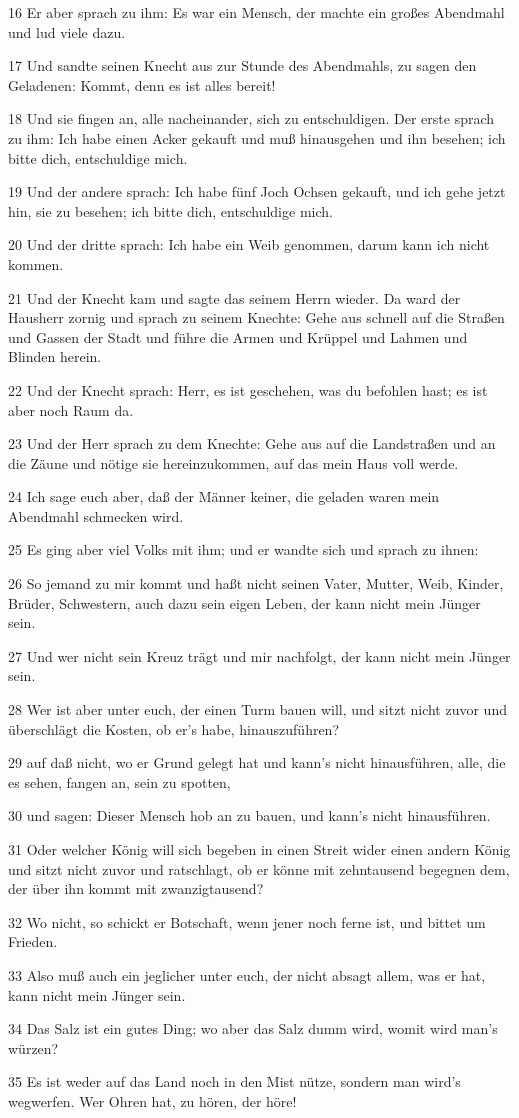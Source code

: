 \par 16 Er aber sprach zu ihm: Es war ein Mensch, der machte ein großes Abendmahl und lud viele dazu.
\par 17 Und sandte seinen Knecht aus zur Stunde des Abendmahls, zu sagen den Geladenen: Kommt, denn es ist alles bereit!
\par 18 Und sie fingen an, alle nacheinander, sich zu entschuldigen. Der erste sprach zu ihm: Ich habe einen Acker gekauft und muß hinausgehen und ihn besehen; ich bitte dich, entschuldige mich.
\par 19 Und der andere sprach: Ich habe fünf Joch Ochsen gekauft, und ich gehe jetzt hin, sie zu besehen; ich bitte dich, entschuldige mich.
\par 20 Und der dritte sprach: Ich habe ein Weib genommen, darum kann ich nicht kommen.
\par 21 Und der Knecht kam und sagte das seinem Herrn wieder. Da ward der Hausherr zornig und sprach zu seinem Knechte: Gehe aus schnell auf die Straßen und Gassen der Stadt und führe die Armen und Krüppel und Lahmen und Blinden herein.
\par 22 Und der Knecht sprach: Herr, es ist geschehen, was du befohlen hast; es ist aber noch Raum da.
\par 23 Und der Herr sprach zu dem Knechte: Gehe aus auf die Landstraßen und an die Zäune und nötige sie hereinzukommen, auf das mein Haus voll werde.
\par 24 Ich sage euch aber, daß der Männer keiner, die geladen waren mein Abendmahl schmecken wird.
\par 25 Es ging aber viel Volks mit ihm; und er wandte sich und sprach zu ihnen:
\par 26 So jemand zu mir kommt und haßt nicht seinen Vater, Mutter, Weib, Kinder, Brüder, Schwestern, auch dazu sein eigen Leben, der kann nicht mein Jünger sein.
\par 27 Und wer nicht sein Kreuz trägt und mir nachfolgt, der kann nicht mein Jünger sein.
\par 28 Wer ist aber unter euch, der einen Turm bauen will, und sitzt nicht zuvor und überschlägt die Kosten, ob er's habe, hinauszuführen?
\par 29 auf daß nicht, wo er Grund gelegt hat und kann's nicht hinausführen, alle, die es sehen, fangen an, sein zu spotten,
\par 30 und sagen: Dieser Mensch hob an zu bauen, und kann's nicht hinausführen.
\par 31 Oder welcher König will sich begeben in einen Streit wider einen andern König und sitzt nicht zuvor und ratschlagt, ob er könne mit zehntausend begegnen dem, der über ihn kommt mit zwanzigtausend?
\par 32 Wo nicht, so schickt er Botschaft, wenn jener noch ferne ist, und bittet um Frieden.
\par 33 Also muß auch ein jeglicher unter euch, der nicht absagt allem, was er hat, kann nicht mein Jünger sein.
\par 34 Das Salz ist ein gutes Ding; wo aber das Salz dumm wird, womit wird man's würzen?
\par 35 Es ist weder auf das Land noch in den Mist nütze, sondern man wird's wegwerfen. Wer Ohren hat, zu hören, der höre!

